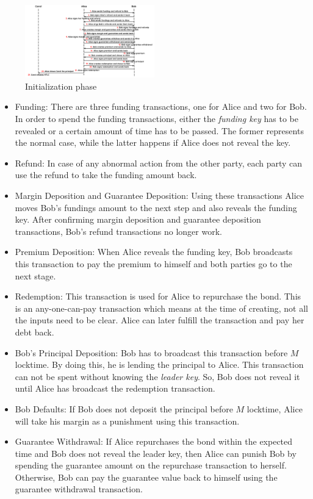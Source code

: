 \documentclass[conference,compsoc]{IEEEtran}
\begin{document}
\begin{figure}
    \centering
    \includegraphics[width=0.5\textwidth]{ABCDinitializationn.pdf}
    \caption{Initialization phase}
    \label{fig:initialization}
\end{figure}
\begin{itemize}
    \item Funding: There are three funding transactions, one for Alice and two for Bob. In order to spend the funding transactions, either the \textit{funding key} has to be revealed or a certain amount of time has to be passed. The former represents the normal case, while the latter happens if Alice does not reveal the key.
    \item Refund: In case of any abnormal action from the other party, each party can use the refund to take the funding amount back.
    \item Margin Deposition and Guarantee Deposition: Using these transactions Alice moves Bob's fundings amount to the next step and also reveals the funding key. After confirming margin deposition and guarantee deposition transactions, Bob's refund transactions no longer work.
    \item Premium Deposition: When Alice reveals the funding key, Bob broadcasts this transaction to pay the premium to himself and both parties go to the next stage.
    \item Redemption: This transaction is used for Alice to repurchase the bond. This is an any-one-can-pay transaction which means at the time of creating, not all the inputs need to be clear. Alice can later fulfill the transaction and pay her debt back. 
    \item Bob's Principal Deposition: Bob has to broadcast this transaction before $M$ locktime. By doing this, he is lending the principal to Alice. This transaction can not be spent without knowing the \textit{leader key}. So, Bob does not reveal it until Alice has broadcast the redemption transaction.
    \item Bob Defaults: If Bob does not deposit the principal before $M$ locktime, Alice will take his margin as a punishment using this transaction.
    \item Guarantee Withdrawal: If Alice repurchases the bond within the expected time and Bob does not reveal the leader key, then Alice can punish Bob by spending the guarantee amount on the repurchase transaction to herself. Otherwise, Bob can pay the guarantee value back to himself using the guarantee withdrawal transaction.
\end{itemize}
\end{document}
